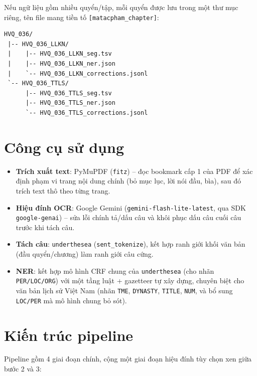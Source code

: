 \documentclass[12pt,a4paper]{article}
\begin{document}
Nếu ngữ liệu gồm nhiều quyển/tập, mỗi quyển được lưu trong một thư mục riêng,
tên file mang tiền tố \texttt{[matacpham\_chapter]}:

\begin{lstlisting}
HVQ_036/
 |-- HVQ_036_LLKN/
 |    |-- HVQ_036_LLKN_seg.tsv
 |    |-- HVQ_036_LLKN_ner.json
 |    `-- HVQ_036_LLKN_corrections.jsonl
 `-- HVQ_036_TTLS/
      |-- HVQ_036_TTLS_seg.tsv
      |-- HVQ_036_TTLS_ner.json
      `-- HVQ_036_TTLS_corrections.jsonl
\end{lstlisting}

\section{Công cụ sử dụng}

\begin{itemize}
  \item \textbf{Trích xuất text}: PyMuPDF (\texttt{fitz}) -- đọc bookmark cấp 1
    của PDF để xác định phạm vi trang nội dung chính (bỏ mục lục, lời nói đầu,
    bìa), sau đó trích text thô theo từng trang.
  \item \textbf{Hiệu đính OCR}: Google Gemini (\texttt{gemini-flash-lite-latest},
    qua SDK \texttt{google-genai}) -- sửa lỗi chính tả/dấu câu và khôi phục dấu
    câu cuối câu trước khi tách câu.
  \item \textbf{Tách câu}: \texttt{underthesea} (\texttt{sent\_tokenize}), kết
    hợp ranh giới khối văn bản (đầu quyển/chương) làm ranh giới câu cứng.
  \item \textbf{NER}: kết hợp mô hình CRF chung của \texttt{underthesea} (cho
    nhãn \texttt{PER/LOC/ORG}) với một tầng luật + gazetteer tự xây dựng, chuyên
    biệt cho văn bản lịch sử Việt Nam (nhãn \texttt{TME}, \texttt{DYNASTY},
    \texttt{TITLE}, \texttt{NUM}, và bổ sung \texttt{LOC/PER} mà mô hình chung
    bỏ sót).
\end{itemize}

\section{Kiến trúc pipeline}

Pipeline gồm 4 giai đoạn chính, cộng một giai đoạn hiệu đính tùy chọn xen giữa
bước 2 và 3:
\end{document}
